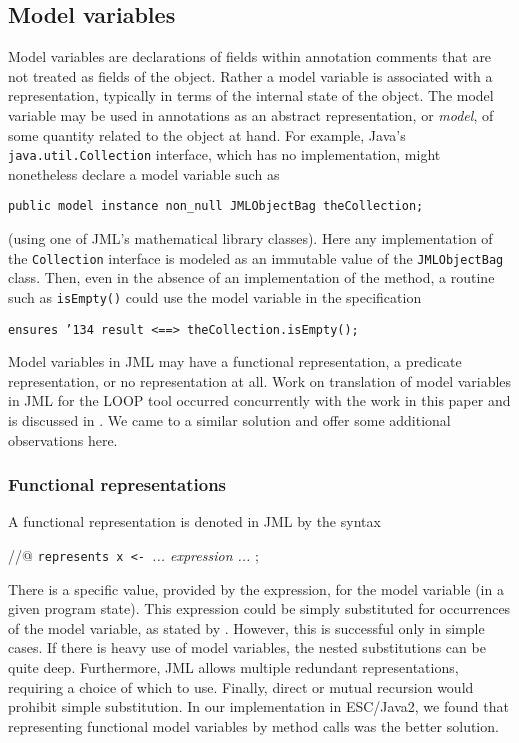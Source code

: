 \documentclass{sig-alternate}
\begin{document}
\subsection{Model variables}

Model variables are declarations of fields within annotation comments that are not treated
as fields of the object.  Rather a model variable is associated with a representation, typically in 
terms of the internal state of the object.  The model variable may be used in annotations
as an abstract representation, or {\em model}, of some quantity related to the object at hand.
For example, Java's \texttt{java.util.Collection} interface, which has no implementation, might 
nonetheless declare a model variable such as
\begin{center} \texttt{public model instance non\_null JMLObjectBag theCollection;} \end{center}
(using one of JML's mathematical library classes).  
Here any implementation of the \texttt{Collection} interface is modeled as an immutable value
of the \texttt{JMLObjectBag} class.  
Then, even in the absence of an implementation of the method, a routine such as 
\texttt{isEmpty()} could use the model variable in the specification
\begin{center} \texttt{ensures \char'134 result <==> theCollection.isEmpty();} \end{center}

Model variables in JML may have a functional representation, a predicate representation, or 
no representation at all.  Work on translation of model variables in JML for the LOOP tool 
occurred concurrently with the work in this paper and is discussed in 
\cite{BreunessePoll03}.  We came to
a similar solution and offer some additional observations here.

\subsubsection {Functional representations}

A functional representation is denoted in JML by the syntax
\begin{center} //@ \texttt{represents x <- }{\em ... expression ... } ; \end{center}
There is a specific value, provided by the expression, for the model variable (in a given program 
state).   This expression could be simply substituted for occurrences of the model variable, as
stated by \cite{BreunessePoll03}.  However, this is successful only in simple cases.  If there
is heavy use of model variables, the nested substitutions can be quite deep.  Furthermore,
JML allows multiple redundant representations, requiring a choice of which to use.  Finally,
direct or mutual recursion would prohibit simple substitution.  In our implementation in
ESC/Java2, we found that representing functional model variables by method
calls was the better
solution.
\end{document}
